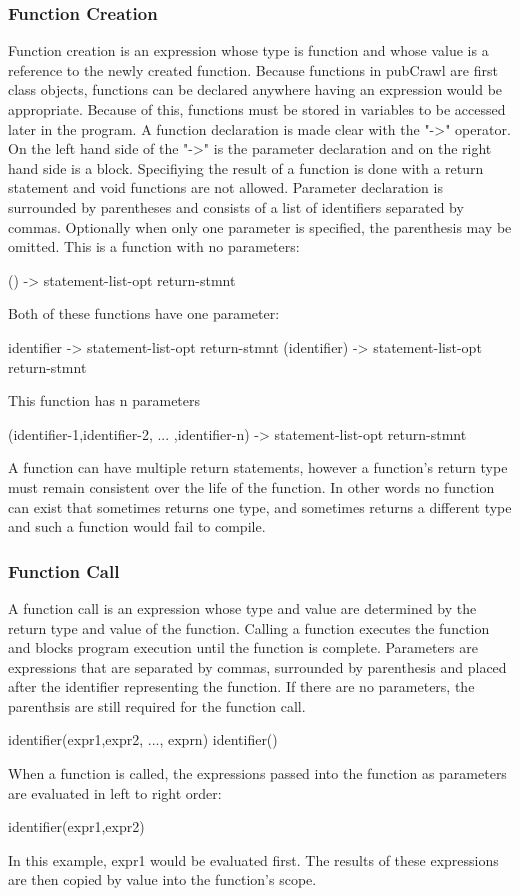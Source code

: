 \documentclass[oneside]{book}
\begin{document}
\subsubsection{Function Creation}
Function creation is an expression whose type is function and whose value is a reference to the newly created function. Because functions in pubCrawl are first class objects, functions can be declared anywhere having an expression would be appropriate. Because of this, functions must be stored in variables to be accessed later in the program. A function declaration is made clear with the "-\textgreater" operator. On the left hand side of the "-\textgreater" is the parameter declaration and on the right hand side is a block. Specifiying the result of a function is done with a return statement and void functions are not allowed. Parameter declaration is surrounded by parentheses and consists of a list of identifiers separated by commas. Optionally when only one parameter is specified, the parenthesis may be omitted. 
This is a function with no parameters:
\begin{code}
() -> {
  statement-list-opt
  return-stmnt
}
\end{code}
Both of these functions have one parameter:
\begin{code}
identifier -> {
  statement-list-opt
  return-stmnt
}
(identifier) -> {
  statement-list-opt
  return-stmnt
}
\end{code}
This function has n parameters
\begin{code}
(identifier-1,identifier-2, ... ,identifier-n) -> {
  statement-list-opt
  return-stmnt
}
\end{code}
A function can have multiple return statements, however a function's return type must remain consistent over the life of the function. In other words no function can exist that sometimes returns one type, and sometimes returns a different type and such a function would fail to compile.

\subsubsection{Function Call}

A function call is an expression whose type and value are determined by the return type and value of the function. Calling a function executes the function and blocks program execution until the function is complete. Parameters are expressions that are separated by commas, surrounded by parenthesis and placed after the identifier representing the function. If there are no parameters, the parenthsis are still required for the function call.
\begin{code}
identifier(expr1,expr2, ..., exprn)
identifier()
\end{code}
When a function is called, the expressions passed into the function as parameters are evaluated in left to right order:
\begin{code}
identifier(expr1,expr2)
\end{code}
In this example, expr1 would be evaluated first. The results of these expressions are then copied by value into the function's scope.
\end{document}
